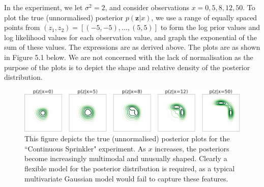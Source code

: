 \documentclass[honours,12pt]{unswthesis}
\numberwithin{equation}{section}
\theoremstyle{definition}
\begin{document}
In the experiment, we let $\sigma^2=2$, and consider observations $x=0,5,8,12,50$. To plot the true (unnormalised) posterior $p(\bm{z}|x)$, we use a range of equally spaced points from $(z_1,z_2)=[(-5,-5),\dots, (5,5)]$ to form the log prior values and log likelihood values for each observation value, and graph the exponential of the sum of these values. The expressions are as derived above. The plots are as shown in Figure 5.1 below. We are not concerned with the lack of normalisation as the purpose of the plots is to depict the shape and relative density of the posterior distribution.\\
\begin{figure}[h]
\includegraphics[width=\textwidth]{sprinklertrue.png}
\caption{\small This figure depicts the true (unnormalised) posterior plots for the ``Continuous Sprinkler" experiment. As $x$ increases, the posteriors become increasingly multimodal and unusually shaped. Clearly a flexible model for the posterior distribution is required, as a typical multivariate Gaussian model would fail to capture these features.}
\end{figure}
\end{document}
